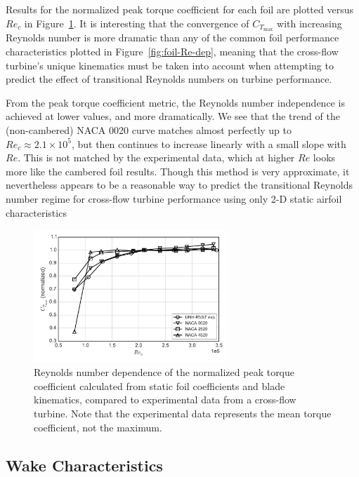 \documentclass[energies,article,accept,moreauthors,pdftex,12pt,a4paper]{mdpi}
\begin{document}
Results for the normalized peak torque coefficient for each foil are plotted
versus $Re_c$ in Figure~\ref{fig:foils-C_T-Re-dep}. It is interesting that the
convergence of $C_{T_\mathrm{max}}$ with increasing Reynolds number is more
dramatic than any of the common foil performance characteristics plotted in
Figure~\ref{fig:foil-Re-dep}, meaning that the cross-flow turbine's unique
kinematics must be taken into account when attempting to predict the effect of
transitional Reynolds numbers on turbine performance.

From the peak torque coefficient metric, the Reynolds number independence is
achieved at lower values, and more dramatically. We see that the trend of the
(non-cambered) NACA 0020 curve matches almost perfectly up to $Re_c \approx 2.1
\times 10^5$, but then continues to increase linearly with a small slope with
$Re$. This is not matched by the experimental data, which at higher $Re$ looks
more like the cambered foil results. Though this method is very approximate, it
nevertheless appears to be a reasonable way to predict the transitional Reynolds
number regime for cross-flow turbine performance using only 2-D static airfoil
characteristics

\begin{figure}[ht!]
\centering

\includegraphics[width=0.65\textwidth]{figures/cft_re_dep_foils}

\caption{Reynolds number dependence of the normalized peak torque coefficient
    calculated from static foil coefficients and blade kinematics, compared to
    experimental data from a cross-flow turbine. Note that the experimental data
    represents the mean torque coefficient, not the maximum.}

\label{fig:foils-C_T-Re-dep}
\end{figure}


\subsection{Wake Characteristics}
\end{document}
